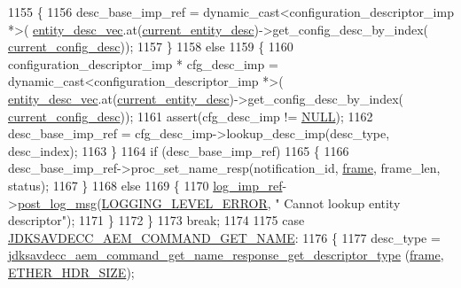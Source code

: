 \begin{DoxyCode}
{{1155         \{
1156             desc\_base\_imp\_ref = \textcolor{keyword}{dynamic\_cast<}configuration\_descriptor\_imp *\textcolor{keyword}{>}(
      \hyperlink{classavdecc__lib_1_1end__station__imp_a72edab41bc56e3c1757944a7df188a3d}{entity\_desc\_vec}.at(\hyperlink{classavdecc__lib_1_1end__station__imp_afd78c89df26ba7641e1adb764c0e827d}{current\_entity\_desc})->get\_config\_desc\_by\_index(
      \hyperlink{classavdecc__lib_1_1end__station__imp_a60b1af40d35e8a86b0082c54ab6cb6a8}{current\_config\_desc}));
1157         \}
1158         \textcolor{keywordflow}{else}
1159         \{
1160             configuration\_descriptor\_imp * cfg\_desc\_imp = \textcolor{keyword}{dynamic\_cast<}configuration\_descriptor\_imp *\textcolor{keyword}{>}(
      \hyperlink{classavdecc__lib_1_1end__station__imp_a72edab41bc56e3c1757944a7df188a3d}{entity\_desc\_vec}.at(\hyperlink{classavdecc__lib_1_1end__station__imp_afd78c89df26ba7641e1adb764c0e827d}{current\_entity\_desc})->get\_config\_desc\_by\_index(
      \hyperlink{classavdecc__lib_1_1end__station__imp_a60b1af40d35e8a86b0082c54ab6cb6a8}{current\_config\_desc}));
1161             assert(cfg\_desc\_imp != \hyperlink{openavb__types__base__pub_8h_a070d2ce7b6bb7e5c05602aa8c308d0c4}{NULL});
1162             desc\_base\_imp\_ref = cfg\_desc\_imp->lookup\_desc\_imp(desc\_type, desc\_index);
1163         \}
1164         \textcolor{keywordflow}{if} (desc\_base\_imp\_ref)
1165         \{
1166             desc\_base\_imp\_ref->proc\_set\_name\_resp(notification\_id, \hyperlink{gst__avb__playbin_8c_ac8e710e0b5e994c0545d75d69868c6f0}{frame}, frame\_len, status);
1167         \}
1168         \textcolor{keywordflow}{else}
1169         \{
1170             \hyperlink{namespaceavdecc__lib_acbe3e2a96ae6524943ca532c87a28529}{log\_imp\_ref}->\hyperlink{classavdecc__lib_1_1log_a68139a6297697e4ccebf36ccfd02e44a}{post\_log\_msg}(\hyperlink{namespaceavdecc__lib_a501055c431e6872ef46f252ad13f85cdaf2c4481208273451a6f5c7bb9770ec8a}{LOGGING\_LEVEL\_ERROR}, \textcolor{stringliteral}{"
      Cannot lookup entity descriptor"});
1171         \}
1172     \}
1173     \textcolor{keywordflow}{break};
1174 
1175     \textcolor{keywordflow}{case} \hyperlink{group__command_gab5a8244c35a72f9d4dcded988c51d8e3}{JDKSAVDECC\_AEM\_COMMAND\_GET\_NAME}:
1176     \{
1177         desc\_type = \hyperlink{group__command__get__name__response_gadfcaac47791f78eeba3f25040e453265}{jdksavdecc\_aem\_command\_get\_name\_response\_get\_descriptor\_type}
      (\hyperlink{gst__avb__playbin_8c_ac8e710e0b5e994c0545d75d69868c6f0}{frame}, \hyperlink{namespaceavdecc__lib_a6c827b1a0d973e18119c5e3da518e65ca9512ad9b34302ba7048d88197e0a2dc0}{ETHER\_HDR\_SIZE});
}}
\end{DoxyCode}
